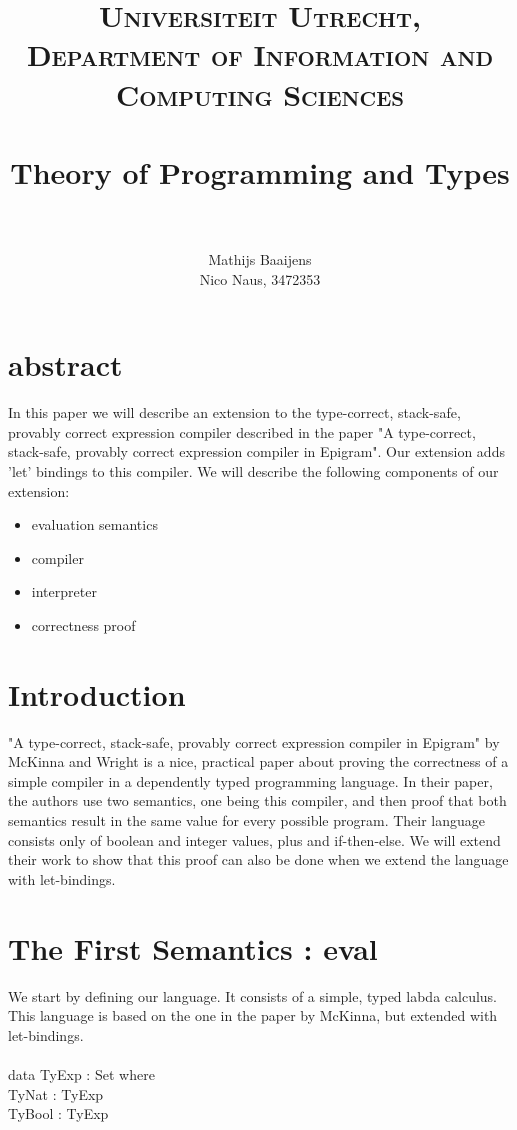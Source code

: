 \documentclass[paper=a4, fontsize=11pt]{scrartcl} %
\title{ 
\normalfont \normalsize 
\textsc{Universiteit Utrecht, Department of Information and Computing Sciences} \\ [25pt] %
\horrule{0.5pt} \\[0.4cm] %
\huge Theory of Programming and Types\\ %
\horrule{2pt} \\[0.5cm] %
}
\author{Mathijs Baaijens\\ Nico Naus, 3472353} %
\numberwithin{equation}{section} %
\numberwithin{figure}{section} %
\numberwithin{table}{section} %
\begin{document}
\maketitle %


\section{abstract}
In this paper we will describe an extension to the type-correct, stack-safe, provably correct expression compiler described in the paper "A type-correct, stack-safe, provably correct expression compiler in Epigram". Our extension adds 'let' bindings to this compiler. We will describe the following components of our extension:
\begin{itemize}
\item{evaluation semantics}
\item{compiler}
\item{interpreter}
\item{correctness proof}
\end{itemize}

\section{Introduction}
"A type-correct, stack-safe, provably correct expression compiler in Epigram" by McKinna and Wright is a nice, practical paper about proving the correctness of a simple compiler in a dependently typed programming language. In their paper, the authors use two semantics, one being this compiler, and then proof that both semantics result in the same value for every possible program. Their language consists only of boolean and integer values, plus and if-then-else. We will extend their work to show that this proof can also be done when we extend the language with let-bindings.
\section{The First Semantics : eval}
We start by defining our language. It consists of a simple, typed labda calculus. This language is based on the one in the paper by McKinna, but extended with let-bindings.\\
\\
\ttfamily
data TyExp : Set where\\
  TyNat : TyExp\\
  TyBool : TyExp\\
\end{document}
